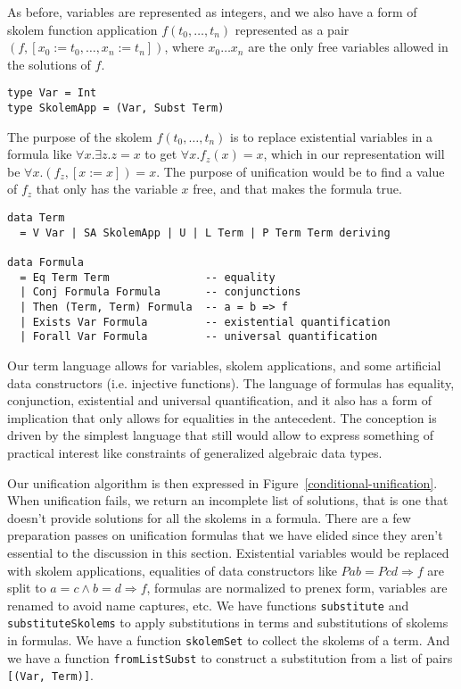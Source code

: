 \documentclass[acmtog, anonymous]{acmart}
\newcommand{\tc}[1]{{\small\texttt{#1}}}
\begin{document}
As before, variables are represented as integers, and we also have a form of
skolem function application $f(t_0,\ldots,t_n)$ represented as a pair
$(f, [x_0:=t_0,\ldots,x_n:=t_n])$, where $x_0 \ldots x_n$ are the only free
variables allowed in the solutions of $f$.

\begin{verbatim}
type Var = Int
type SkolemApp = (Var, Subst Term)
\end{verbatim}

The purpose of the skolem $f(t_0,\ldots,t_n)$ is to replace existential variables
in a formula like $\forall x. \exists z. z = x$ to get $\forall x. f_z(x) = x$, which
in our representation will be $\forall x. (f_z, [x:=x]) = x$.
The purpose of unification would be to find a value of $f_z$ that only has the variable
$x$ free, and that makes the formula true.

\begin{verbatim}
data Term
  = V Var | SA SkolemApp | U | L Term | P Term Term deriving

data Formula
  = Eq Term Term               -- equality
  | Conj Formula Formula       -- conjunctions
  | Then (Term, Term) Formula  -- a = b => f
  | Exists Var Formula         -- existential quantification
  | Forall Var Formula         -- universal quantification
\end{verbatim}

Our term language allows for variables, skolem applications, and some artificial
data constructors (i.e. injective functions). The language of formulas has
equality, conjunction, existential and universal quantification, and it also
has a form of implication that only allows for equalities in the antecedent.
The conception is driven by the simplest language that still would allow to
express something of practical interest like constraints of generalized
algebraic data types.

Our unification algorithm is then expressed in Figure~\ref{conditional-unification}.
When unification fails, we return an incomplete list of solutions, that is one that
doesn't provide solutions for all the skolems in a formula.
There are a few preparation passes on unification formulas that we have elided since
they aren't essential to the discussion in this section.
Existential variables would be replaced with skolem applications, equalities of
data constructors like $P a b = P c d \Rightarrow f$ are split to
$a = c \land b = d \Rightarrow f$, formulas are normalized to prenex form, variables
are renamed to avoid name captures, etc. We have functions \tc{substitute} and
\tc{substituteSkolems} to apply substitutions in terms and substitutions of skolems
in formulas. We have a function \tc{skolemSet} to collect the skolems of a
term. And we have a function \tc{fromListSubst} to construct a substitution from
a list of pairs \tc{[(Var, Term)]}.
\end{document}
